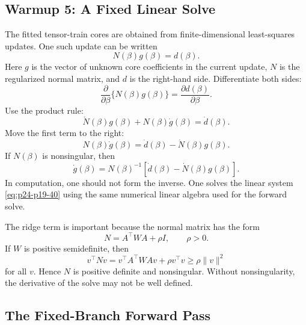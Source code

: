 \documentclass[11pt]{article}
\numberwithin{equation}{section}
\begin{document}
\subsection{Warmup 5: A Fixed Linear Solve}

The fitted tensor-train cores are obtained from finite-dimensional least-squares
updates.  One such update can be written
\begin{equation}
    N(\beta)g(\beta)=d(\beta).
    \label{eq:p24-p19-37}
\end{equation}
Here \(g\) is the vector of unknown core coefficients in the current update,
\(N\) is the regularized normal matrix, and \(d\) is the right-hand side.
Differentiate both sides:
\begin{equation}
    \frac{\partial}{\partial\beta}\{N(\beta)g(\beta)\}
    =
    \frac{\partial d(\beta)}{\partial\beta}.
    \label{eq:p24-p19-38}
\end{equation}
Use the product rule:
\begin{equation}
    \dot N(\beta)g(\beta)+N(\beta)\dot g(\beta)=\dot d(\beta).
    \label{eq:p24-p19-39}
\end{equation}
Move the first term to the right:
\begin{equation}
    N(\beta)\dot g(\beta)=\dot d(\beta)-\dot N(\beta)g(\beta).
    \label{eq:p24-p19-40}
\end{equation}
If \(N(\beta)\) is nonsingular, then
\begin{equation}
    \dot g(\beta)=
    N(\beta)^{-1}\left[\dot d(\beta)-\dot N(\beta)g(\beta)\right].
    \label{eq:p24-p19-41}
\end{equation}
In computation, one should not form the inverse.  One solves the linear system
\eqref{eq:p24-p19-40} using the same numerical linear algebra used for the forward solve.

The ridge term is important because the normal matrix has the form
\begin{equation}
    N=A^\top W A+\rho I,
    \qquad \rho>0.
    \label{eq:p24-p19-42}
\end{equation}
If \(W\) is positive semidefinite, then
\begin{equation}
    v^\top N v
    =
    v^\top A^\top W A v+\rho v^\top v
    \ge
    \rho\|v\|^2
    \label{eq:p24-p19-43}
\end{equation}
for all \(v\).  Hence \(N\) is positive definite and nonsingular.  Without
nonsingularity, the derivative of the solve may not be well defined.

\subsection{The Fixed-Branch Forward Pass}
\end{document}
